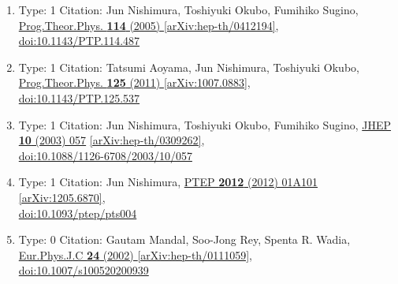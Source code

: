 \documentclass[a4paper,10pt]{article}
\begin{document}
\begin{enumerate}
\begin{enumerate}
  \item Type: 1 Citation: Jun Nishimura, Toshiyuki Okubo, Fumihiko Sugino, \href{https://www.doi.org/10.1143/PTP.114.487}{Prog.Theor.Phys. {\bf 114} (2005) }  \href{https://arxiv.org/abs/hep-th/0412194}{[arXiv:hep-th/0412194]},\\\href{https://www.doi.org/10.1143/PTP.114.487}{doi:10.1143/PTP.114.487}
  \item Type: 1 Citation: Tatsumi Aoyama, Jun Nishimura, Toshiyuki Okubo, \href{https://www.doi.org/10.1143/PTP.125.537}{Prog.Theor.Phys. {\bf 125} (2011) }  \href{https://arxiv.org/abs/1007.0883}{[arXiv:1007.0883]},\\\href{https://www.doi.org/10.1143/PTP.125.537}{doi:10.1143/PTP.125.537}
  \item Type: 1 Citation: Jun Nishimura, Toshiyuki Okubo, Fumihiko Sugino, \href{https://www.doi.org/10.1088/1126-6708/2003/10/057}{JHEP {\bf 10} (2003) 057}  \href{https://arxiv.org/abs/hep-th/0309262}{[arXiv:hep-th/0309262]},\\\href{https://www.doi.org/10.1088/1126-6708/2003/10/057}{doi:10.1088/1126-6708/2003/10/057}
  \item Type: 1 Citation: Jun Nishimura, \href{https://www.doi.org/10.1093/ptep/pts004}{PTEP {\bf 2012} (2012) 01A101}  \href{https://arxiv.org/abs/1205.6870}{[arXiv:1205.6870]},\\\href{https://www.doi.org/10.1093/ptep/pts004}{doi:10.1093/ptep/pts004}
  \item Type: 0 Citation: Gautam Mandal, Soo-Jong Rey, Spenta R. Wadia, \href{https://www.doi.org/10.1007/s100520200939}{Eur.Phys.J.C {\bf 24} (2002) }  \href{https://arxiv.org/abs/hep-th/0111059}{[arXiv:hep-th/0111059]},\\\href{https://www.doi.org/10.1007/s100520200939}{doi:10.1007/s100520200939}

\end{enumerate}
\end{enumerate}
\end{document}
